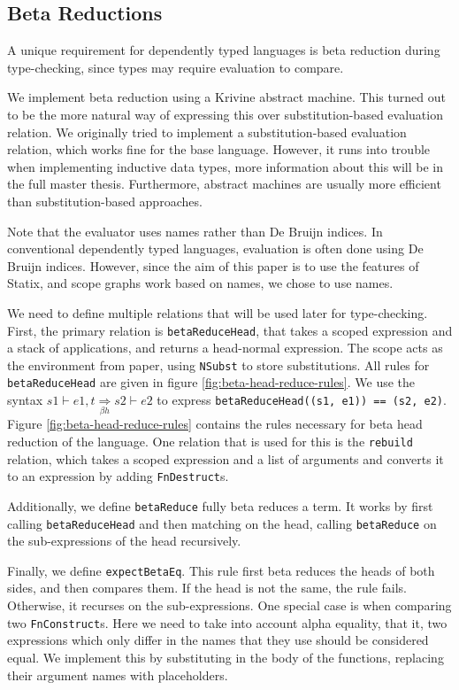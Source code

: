 \documentclass[a4paper,UKenglish,cleveref, autoref, thm-restate]{oasics-v2021}
\newcommand{\bhr}{\underset{\beta h}{\Rightarrow}}
\begin{document}
\subsection{Beta Reductions}
\label{sec:coc-dynsyms}

A unique requirement for dependently typed languages is beta reduction during type-checking, since types may require evaluation to compare.

We implement beta reduction using a Krivine abstract machine\cite{krivine}. This turned out to be the more natural way of expressing this over substitution-based evaluation relation. We originally tried to implement a substitution-based evaluation relation, which works fine for the base language. However, it runs into trouble when implementing inductive data types, more information about this will be in the full master thesis. Furthermore, abstract machines are usually more efficient than substitution-based approaches.

Note that the evaluator uses names rather than De Bruijn indices. In conventional dependently typed languages, evaluation is often done using De Bruijn indices. However, since the aim of this paper is to use the features of Statix, and scope graphs work based on names, we chose to use names.

We need to define multiple relations that will be used later for type-checking. First, the primary relation is \verb|betaReduceHead|, that takes a scoped expression and a stack of applications, and returns a head-normal expression. The scope acts as the environment from \cite{krivine} paper, using \verb|NSubst| to store substitutions. All rules for \verb|betaReduceHead| are given in figure \ref{fig:beta-head-reduce-rules}. We use the syntax $s1 \vdash e1, t \bhr s2 \vdash e2$ to express \verb|betaReduceHead((s1, e1)) == (s2, e2)|. Figure \ref{fig:beta-head-reduce-rules} contains the rules necessary for beta head reduction of the language. One relation that is used for this is the \verb|rebuild| relation, which takes a scoped expression and a list of arguments and converts it to an expression by adding \verb|FnDestruct|s.

Additionally, we define \verb|betaReduce| fully beta reduces a term. It works by first calling \verb|betaReduceHead| and then matching on the head, calling \verb|betaReduce| on the sub-expressions of the head recursively.

Finally, we define \verb|expectBetaEq|. This rule first beta reduces the heads of both sides, and then compares them. If the head is not the same, the rule fails. Otherwise, it recurses on the sub-expressions. One special case is when comparing two \verb|FnConstruct|s. Here we need to take into account alpha equality, that it, two expressions which only differ in the names that they use should be considered equal. We implement this by substituting in the body of the functions, replacing their argument names with placeholders. 
\end{document}

